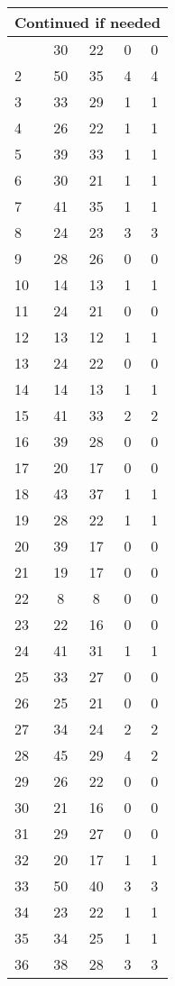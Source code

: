 \begin{center}
\begin{longtable}{l|c|c|c|c}
\hline \multicolumn{5}{|r|}{{Continued if needed}} \\ \hline
\endfoot 
1 & 30 & 22 & 0 & 0\\ \hline
2 & 50 & 35 & 4 & 4\\ \hline
3 & 33 & 29 & 1 & 1\\ \hline
4 & 26 & 22 & 1 & 1\\ \hline
5 & 39 & 33 & 1 & 1\\ \hline
6 & 30 & 21 & 1 & 1\\ \hline
7 & 41 & 35 & 1 & 1\\ \hline
8 & 24 & 23 & 3 & 3\\ \hline
9 & 28 & 26 & 0 & 0\\ \hline
10 & 14 & 13 & 1 & 1\\ \hline
11 & 24 & 21 & 0 & 0\\ \hline
12 & 13 & 12 & 1 & 1\\ \hline
13 & 24 & 22 & 0 & 0\\ \hline
14 & 14 & 13 & 1 & 1\\ \hline
15 & 41 & 33 & 2 & 2\\ \hline
16 & 39 & 28 & 0 & 0\\ \hline
17 & 20 & 17 & 0 & 0\\ \hline
18 & 43 & 37 & 1 & 1\\ \hline
19 & 28 & 22 & 1 & 1\\ \hline
20 & 39 & 17 & 0 & 0\\ \hline
21 & 19 & 17 & 0 & 0\\ \hline
22 & 8 & 8 & 0 & 0\\ \hline
23 & 22 & 16 & 0 & 0\\ \hline
24 & 41 & 31 & 1 & 1\\ \hline
25 & 33 & 27 & 0 & 0\\ \hline
26 & 25 & 21 & 0 & 0\\ \hline
27 & 34 & 24 & 2 & 2\\ \hline
28 & 45 & 29 & 4 & 2\\ \hline
29 & 26 & 22 & 0 & 0\\ \hline
30 & 21 & 16 & 0 & 0\\ \hline
31 & 29 & 27 & 0 & 0\\ \hline
32 & 20 & 17 & 1 & 1\\ \hline
33 & 50 & 40 & 3 & 3\\ \hline
34 & 23 & 22 & 1 & 1\\ \hline
35 & 34 & 25 & 1 & 1\\ \hline
36 & 38 & 28 & 3 & 3\\ \hline

\end{longtable}
\end{center}
